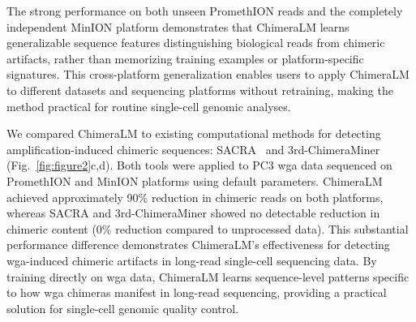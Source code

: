 \documentclass[pdflatex,sn-nature,lineno]{sn-jnl}%
\theoremstyle{thmstyleone}%
\theoremstyle{thmstyletwo}%
\theoremstyle{thmstylethree}%
\begin{document}
The strong performance on both unseen PromethION reads and the completely independent MinION platform demonstrates that ChimeraLM learns generalizable sequence features distinguishing biological reads from chimeric artifacts, rather than memorizing training examples or platform-specific signatures.
This cross-platform generalization enables users to apply ChimeraLM to different datasets and sequencing platforms without retraining, making the method practical for routine single-cell genomic analyses.

We compared ChimeraLM to existing computational methods for detecting amplification-induced chimeric sequences: SACRA~\cite{kiguchi2021longread} and 3rd-ChimeraMiner~\cite{lu2023exploration} (Fig.~\ref{fig:figure2}c,d).
Both tools were applied to PC3 \gls{wga} data sequenced on PromethION and MinION platforms using default parameters.
ChimeraLM achieved approximately 90\% reduction in chimeric reads on both platforms, whereas SACRA and 3rd-ChimeraMiner showed no detectable reduction in chimeric content (0\% reduction compared to unprocessed data).
This substantial performance difference demonstrates ChimeraLM's effectiveness for detecting \gls{wga}-induced chimeric artifacts in long-read single-cell sequencing data.
By training directly on \gls{wga} data, ChimeraLM learns sequence-level patterns specific to how \gls{wga} chimeras manifest in long-read sequencing, providing a practical solution for single-cell genomic quality control.
\end{document}
